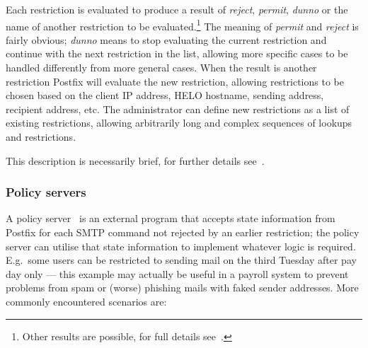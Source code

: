 \documentclass[a4paper,12pt,draft]{article}
\begin{document}
Each restriction is evaluated to produce a result of \textit{reject},
\textit{permit}, \textit{dunno\/} or the name of another restriction to be
evaluated.\footnote{Other results are possible, for full details
see~\cite{smtpd_access_readme, smtpd_per_user_control, policy-servers}.}
The meaning of \textit{permit\/} and \textit{reject\/} is fairly obvious;
\textit{dunno\/} means to stop evaluating the current restriction and
continue with the next restriction in the list, allowing more specific
cases to be handled differently from more general cases.  When the result
is another restriction Postfix will evaluate the new restriction, allowing
restrictions to be chosen based on the client IP address, HELO hostname,
sending address, recipient address, etc.  The administrator can define new
restrictions as a list of existing restrictions, allowing arbitrarily long
and complex sequences of lookups and restrictions.

This description is necessarily brief, for further details
see~\cite{smtpd_access_readme, smtpd_per_user_control, policy-servers}.


\subsubsection{Policy servers}

A policy server~\cite{policy-servers} is an external program that accepts
state information from Postfix for each SMTP command not rejected by an
earlier restriction; the policy server can utilise that state information
to implement whatever logic is required.  E.g.\ some users can be
restricted to sending mail on the third Tuesday after pay day only --- this
example may actually be useful in a payroll system to prevent problems from
spam or (worse) phishing mails with faked sender addresses.  More commonly
encountered scenarios are:
\end{document}
